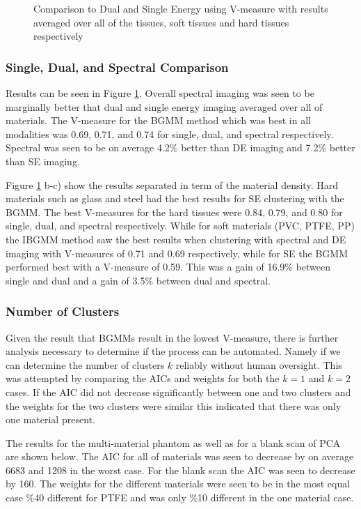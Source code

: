 \documentclass[a4paper,11pt]{article}
\begin{document}
\begin{figure}[b!]
\begin{subfigure}[b]{0.32\textwidth}
    \end{subfigure}
    \caption{Comparison to Dual and Single Energy using V-measure with results averaged over all of the tissues, soft tissues and hard tissues respectively}
    \label{results:hard_soft}
\end{figure}

\subsubsection{Single, Dual, and Spectral Comparison}

Results can be seen in Figure \ref{results:hard_soft}. Overall spectral imaging was seen to be marginally better that dual and single energy imaging averaged over all of materials. The V-measure for the BGMM method which was best in all modalities was 0.69, 0.71, and 0.74 for single, dual, and spectral respectively. Spectral was seen to be on average 4.2\% better than DE imaging and 7.2\% better than SE imaging.

Figure \ref{results:hard_soft} b-c) show the results separated in term of the material density. Hard materials such as glass and steel had the best results for SE clustering with the BGMM. The best V-measures for the hard tissues were 0.84, 0.79, and 0.80 for single, dual, and spectral respectively. While for soft materials (PVC, PTFE, PP) the IBGMM method saw the best results when clustering with spectral and DE imaging with V-measures of 0.71 and 0.69 respectively, while for SE the BGMM performed best with a V-measure of 0.59. This was a gain of 16.9\% between single and dual and a gain of 3.5\% between dual and spectral.

\subsubsection{Number of Clusters}

Given the result that BGMMs result in the lowest V-measure, there is further analysis necessary to determine if the process can be automated. Namely if we can determine the number of clusters $k$ reliably without human oversight. This was attempted by comparing the AICs and weights for both the $k=1$ and $k=2$ cases. If the AIC did not decrease significantly between one and two clusters and the weights for the two clusters were similar this indicated that there was only one material present.

The results for the multi-material phantom as well as for a blank scan of PCA are shown below. The AIC for all of materials was seen to decrease by on average 6683 and 1208 in the worst case. For the blank scan the AIC was seen to decrease by 160. The weights for the different materials were seen to be in the most equal case \%40 different for PTFE and was only \%10 different in the one material case.
\end{document}
